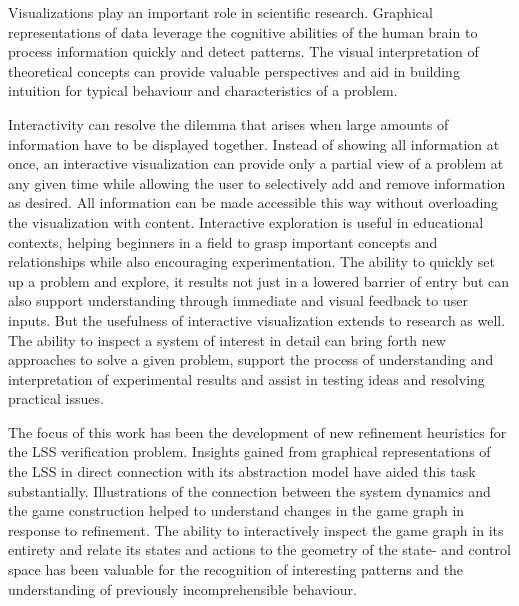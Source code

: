 Visualizations play an important role in scientific research.
Graphical representations of data leverage the cognitive abilities of the human brain to process information quickly and detect patterns.
The visual interpretation of theoretical concepts can provide valuable perspectives and aid in building intuition for typical behaviour and characteristics of a problem.

Interactivity can resolve the dilemma that arises when large amounts of information have to be displayed together.
Instead of showing all information at once, an interactive visualization can provide only a partial view of a problem at any given time while allowing the user to selectively add and remove information as desired.
All information can be made accessible this way without overloading the visualization with content.
Interactive exploration is useful in educational contexts, helping beginners in a field to grasp important concepts and relationships while also encouraging experimentation.
The ability to quickly set up a problem and explore, it results not just in a lowered barrier of entry but can also support understanding through immediate and visual feedback to user inputs.
But the usefulness of interactive visualization extends to research as well.
The ability to inspect a system of interest in detail can bring forth new approaches to solve a given problem, support the process of understanding and interpretation of experimental results and assist in testing ideas and resolving practical issues.

The focus of this work has been the development of new refinement heuristics for the LSS verification problem.
Insights gained from graphical representations of the LSS in direct connection with its abstraction model have aided this task substantially.
Illustrations of the connection between the system dynamics and the game construction helped to understand changes in the game graph in response to refinement.
The ability to interactively inspect the game graph in its entirety and relate its states and actions to the geometry of the state- and control space has been valuable for the recognition of interesting patterns and the understanding of previously incomprehensible behaviour.

